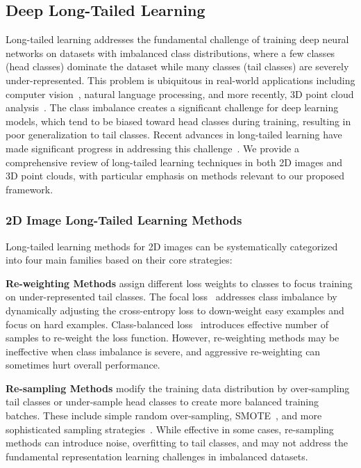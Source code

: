 \documentclass[preprint,12pt]{elsarticle}
\begin{document}
\subsection{Deep Long-Tailed Learning}
\label{sec:long_tailed}

Long-tailed learning addresses the fundamental challenge of training deep neural networks on datasets with imbalanced class distributions, where a few classes (head classes) dominate the dataset while many classes (tail classes) are severely under-represented. This problem is ubiquitous in real-world applications including computer vision~\cite{zhang2021deep}, natural language processing, and more recently, 3D point cloud analysis~\cite{armeni2016s3dis, dai2017scannet, hackel2017semantic3d}. The class imbalance creates a significant challenge for deep learning models, which tend to be biased toward head classes during training, resulting in poor generalization to tail classes. Recent advances in long-tailed learning have made significant progress in addressing this challenge~\cite{zhang2021deep, zhang2021distribution}. We provide a comprehensive review of long-tailed learning techniques in both 2D images and 3D point clouds, with particular emphasis on methods relevant to our proposed framework.

\subsubsection{2D Image Long-Tailed Learning Methods}
Long-tailed learning methods for 2D images can be systematically categorized into four main families based on their core strategies:

\textbf{Re-weighting Methods} assign different loss weights to classes to focus training on under-represented tail classes. The focal loss~\cite{lin2017focal} addresses class imbalance by dynamically adjusting the cross-entropy loss to down-weight easy examples and focus on hard examples. Class-balanced loss~\cite{cui2019class} introduces effective number of samples to re-weight the loss function. However, re-weighting methods may be ineffective when class imbalance is severe, and aggressive re-weighting can sometimes hurt overall performance.

\textbf{Re-sampling Methods} modify the training data distribution by over-sampling tail classes or under-sample head classes to create more balanced training batches. These include simple random over-sampling, SMOTE~\cite{chawla2002smote}, and more sophisticated sampling strategies~\cite{more2016survey, buda2018systematic}. While effective in some cases, re-sampling methods can introduce noise, overfitting to tail classes, and may not address the fundamental representation learning challenges in imbalanced datasets.
\end{document}
